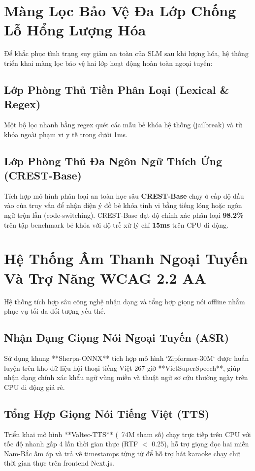 \documentclass[journal]{IEEEtran}
\begin{document}
\section{Màng Lọc Bảo Vệ Đa Lớp Chống Lỗ Hổng Lượng Hóa}
Để khắc phục tình trạng suy giảm an toàn của SLM sau khi lượng hóa, hệ thống triển khai màng lọc bảo vệ hai lớp hoạt động hoàn toàn ngoại tuyến:

\subsection{Lớp Phòng Thủ Tiền Phân Loại (Lexical \& Regex)}
Một bộ lọc nhanh bằng regex quét các mẫu bẻ khóa hệ thống (jailbreak) và từ khóa ngoài phạm vi y tế trong dưới 1ms.

\subsection{Lớp Phòng Thủ Đa Ngôn Ngữ Thích Ứng (CREST-Base)}
Tích hợp mô hình phân loại an toàn học sâu \textbf{CREST-Base} chạy ở cấp độ đầu vào của truy vấn để nhận diện ý đồ bẻ khóa tinh vi bằng tiếng lóng hoặc ngôn ngữ trộn lẫn (code-switching). CREST-Base đạt độ chính xác phân loại \textbf{98.2\%} trên tập benchmark bẻ khóa với độ trễ xử lý chỉ \textbf{15ms} trên CPU di động.

\section{Hệ Thống Âm Thanh Ngoại Tuyến Và Trợ Năng WCAG 2.2 AA}
Hệ thống tích hợp sâu công nghệ nhận dạng và tổng hợp giọng nói offline nhằm phục vụ tối đa đối tượng yếu thế.

\subsection{Nhận Dạng Giọng Nói Ngoại Tuyến (ASR)}
Sử dụng khung **Sherpa-ONNX** tích hợp mô hình `Zipformer-30M` được huấn luyện trên kho dữ liệu hội thoại tiếng Việt 267 giờ **VietSuperSpeech**, giúp nhận dạng chính xác khẩu ngữ vùng miền và thuật ngữ sơ cứu thường ngày trên CPU di động giá rẻ.

\subsection{Tổng Hợp Giọng Nói Tiếng Việt (TTS)}
Triển khai mô hình **Valtec-TTS** (~74M tham số) chạy trực tiếp trên CPU với tốc độ nhanh gấp 4 lần thời gian thực (RTF $<$ 0.25), hỗ trợ giọng đọc hai miền Nam-Bắc ấm áp và trả về timestamps từng từ để hỗ trợ hát karaoke chạy chữ thời gian thực trên frontend Next.js.
\end{document}

